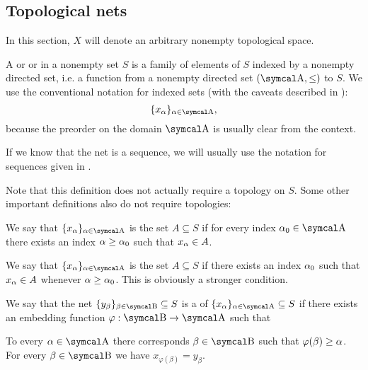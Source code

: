 \subsection{Topological nets}\label{subsec:topological_nets}

In this section, \( X \) will denote an arbitrary nonempty topological space.

\begin{definition}\label{def:topological_net}
  A  or  or  in a nonempty set \( S \) is a family of elements of \( S \) indexed by a nonempty directed set, i.e. a function from a nonempty directed set \( (\CA, \leq) \) to \( S \). We use the conventional notation for indexed sets (with the caveats described in ):
  \begin{equation*}
    \{ x_\al \}_{\al \in \CA},
  \end{equation*}
  because the preorder on the domain \( \CA \) is usually clear from the context.

  If we know that the net is a sequence, we will usually use the notation for sequences given in .

  Note that this definition does not actually require a topology on \( S \). Some other important definitions also do not require topologies:
  \begin{defenum}
     We say that \( \{ x_\al \}_{\al \in \CA} \) is  the set \( A \subseteq S \) if for every index \( \al_0 \in \CA \) there exists an index \( \alpha \geq \alpha_0 \) such that \( x_\alpha \in A \).

     We say that \( \{ x_\al \}_{\al \in \CA} \) is  the set \( A \subseteq S \) if there exists an index \( \alpha_0 \) such that \( x_\alpha \in A \) whenever \( \alpha \geq \alpha_0 \). This is obviously a stronger condition.

    \cite[50]{Engelking1989} We say that the net \( \{ y_\beta \}_{\beta \in \CB} \subseteq S \) is a  of \( \{ x_\al \}_{\al \in \CA} \subseteq S \) if there exists an embedding function \( \varphi: \CB \to \CA \) such that
    \begin{defenum}
       To every \( \al \in \CA \) there corresponds \( \beta \in \CB \) such that \( \varphi(\beta) \geq \alpha \).
       For every \( \beta \in \CB \) we have \( x_{\varphi(\beta)} = y_\beta \).
    \end{defenum}
  \end{defenum}
\end{definition}

